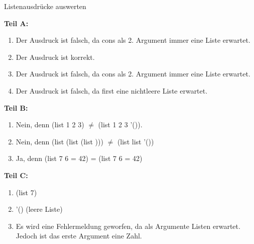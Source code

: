 \documentclass{../preamble}
\begin{document}
\begin{task}[credit = \stars{1}{3}]{Listenausdrücke auswerten}
	\begin{solution}
		{\large\textbf{Teil A:}}
		\begin{enumerate}
			\item Der Ausdruck ist falsch, da \textcolor{keywordcolor}{cons} als 2. Argument immer eine Liste erwartet.
			\item Der Ausdruck ist korrekt.
			\item Der Ausdruck ist falsch, da \textcolor{keywordcolor}{cons} als 2. Argument immer eine Liste erwartet.
			\item Der Ausdruck ist falsch, da \textcolor{keywordcolor}{first} eine nichtleere Liste erwartet.
		\end{enumerate}
		{\large\textbf{Teil B:}}
		\begin{enumerate}
			\item Nein, denn (\textcolor{keywordcolor}{list} 1 2 3) \(\neq\) (list 1 2 3 \textcolor{keywordcolor}{'()}).
			\item Nein, denn (\textcolor{keywordcolor}{list} (\textcolor{keywordcolor}{list} \grqq (list )\grqq)) \(\neq\) (\textcolor{keywordcolor}{list} \grqq list\grqq{} \textcolor{keywordcolor}{'()})
			\item Ja, denn (\textcolor{keywordcolor}{list} 7 \grqq *\grqq{} 6 \grqq =\grqq{} 42) = (\textcolor{keywordcolor}{list} 7 \grqq *\grqq{} 6 \grqq =\grqq{} 42)
		\end{enumerate}
		{\large\textbf{Teil C:}}
		\begin{enumerate}
			\item (\textcolor{keywordcolor}{list} 7)
			\item \textcolor{keywordcolor}{'()} (leere Liste)
			\item Es wird eine Fehlermeldung geworfen, da  als Argumente Listen erwartet. Jedoch ist das erste Argument eine Zahl.
		\end{enumerate}
	\end{solution}
\end{task}

\clearpage
\end{document}

